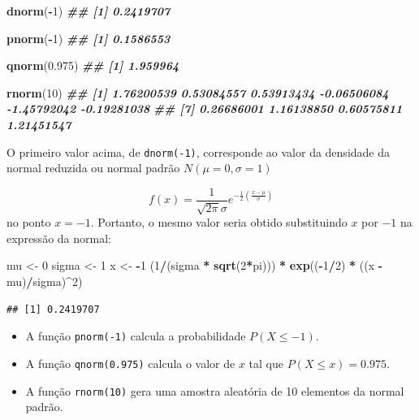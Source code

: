 \documentclass[
]{book}
\newenvironment{Shaded}{\begin{snugshade}}{\end{snugshade}}
\newcommand{\DecValTok}[1]{\textcolor[rgb]{0.00,0.00,0.81}{#1}}
\newcommand{\DocumentationTok}[1]{\textcolor[rgb]{0.56,0.35,0.01}{\textbf{\textit{#1}}}}
\newcommand{\FloatTok}[1]{\textcolor[rgb]{0.00,0.00,0.81}{#1}}
\newcommand{\FunctionTok}[1]{\textcolor[rgb]{0.13,0.29,0.53}{\textbf{#1}}}
\newcommand{\NormalTok}[1]{#1}
\newcommand{\OtherTok}[1]{\textcolor[rgb]{0.56,0.35,0.01}{#1}}
\newcommand{\SpecialCharTok}[1]{\textcolor[rgb]{0.81,0.36,0.00}{\textbf{#1}}}
\begin{document}
\begin{Shaded}
\begin{Highlighting}[]
\FunctionTok{dnorm}\NormalTok{(}\SpecialCharTok{{-}}\DecValTok{1}\NormalTok{)}
\DocumentationTok{\#\# [1] 0.2419707}

\FunctionTok{pnorm}\NormalTok{(}\SpecialCharTok{{-}}\DecValTok{1}\NormalTok{)}
\DocumentationTok{\#\# [1] 0.1586553}

\FunctionTok{qnorm}\NormalTok{(}\FloatTok{0.975}\NormalTok{)}
\DocumentationTok{\#\# [1] 1.959964}

\FunctionTok{rnorm}\NormalTok{(}\DecValTok{10}\NormalTok{)}
\DocumentationTok{\#\#  [1]  1.76200539  0.53084557  0.53913434 {-}0.06506084 {-}1.45792042 {-}0.19281038}
\DocumentationTok{\#\#  [7]  0.26686001  1.16138850  0.60575811  1.21451547}
\end{Highlighting}
\end{Shaded}

O primeiro valor acima, de \texttt{dnorm(-1)}, corresponde ao valor da densidade da normal reduzida ou normal padrão \(N(\mu=0,\sigma=1)\)

\[f(x) = \frac{1}{\sqrt{2\pi}\sigma}e^{-\frac{1}{2}\left( \frac{x-\mu}{\sigma}\right)}\]
no ponto \(x=-1\). Portanto, o mesmo valor seria obtido substituindo \(x\) por \(-1\) na expressão da normal:

\begin{Shaded}
\begin{Highlighting}[]
\NormalTok{mu }\OtherTok{\textless{}{-}} \DecValTok{0}
\NormalTok{sigma }\OtherTok{\textless{}{-}} \DecValTok{1}
\NormalTok{x }\OtherTok{\textless{}{-}} \SpecialCharTok{{-}}\DecValTok{1}
\NormalTok{(}\DecValTok{1}\SpecialCharTok{/}\NormalTok{(sigma }\SpecialCharTok{*} \FunctionTok{sqrt}\NormalTok{(}\DecValTok{2}\SpecialCharTok{*}\NormalTok{pi))) }\SpecialCharTok{*} \FunctionTok{exp}\NormalTok{((}\SpecialCharTok{{-}}\DecValTok{1}\SpecialCharTok{/}\DecValTok{2}\NormalTok{) }\SpecialCharTok{*}\NormalTok{ ((x }\SpecialCharTok{{-}}\NormalTok{ mu)}\SpecialCharTok{/}\NormalTok{sigma)}\SpecialCharTok{\^{}}\DecValTok{2}\NormalTok{)}
\end{Highlighting}
\end{Shaded}

\begin{verbatim}
## [1] 0.2419707
\end{verbatim}

\begin{itemize}
\item
  A função \texttt{pnorm(-1)} calcula a probabilidade \(P(X \leq -1)\).
\item
  A função \texttt{qnorm(0.975)} calcula o valor de \(x\) tal que \(P(X\leq x) = 0.975\).
\item
  A função \texttt{rnorm(10)} gera uma amostra aleatória de 10 elementos da normal padrão.
\end{itemize}
\end{document}

